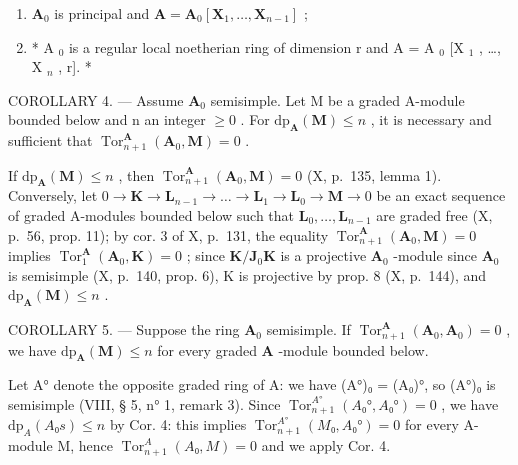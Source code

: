 \begin{enumerate}
\def\labelenumi{\alph{enumi})}
\item
  \(\mathbf{A}_0\) is principal and \(\mathbf{A} = \mathbf{A}_0[\mathbf{X}_1, \dots, \mathbf{X}_{n-1}]\) ;
\item
  * A \(_{0}\) is a regular local noetherian ring of dimension r and A = A \(_{0}\) {[}X \(_{1}\) , \ldots, X \(_{n}\) , r{]}. *
\end{enumerate}

COROLLARY 4. --- Assume \(\mathbf{A}_{0}\) semisimple. Let M be a graded A-module bounded below and n an integer \(\geqslant 0\) . For \(\mathrm{dp}_{\mathbf{A}}(\mathbf{M}) \leqslant n\) , it is necessary and sufficient that \(\operatorname{Tor}_{n+1}^{\mathbf{A}}(\mathbf{A}_{0}, \mathbf{M}) = 0\) .

If \(\mathrm{dp}_{\mathbf{A}}(\mathbf{M}) \leqslant n\) , then \(\operatorname{Tor}_{n+1}^{\mathbf{A}}(\mathbf{A}_0, \mathbf{M}) = 0\) (X, p.~135, lemma 1). Conversely, let \(0 \to \mathbf{K} \to \mathbf{L}_{n-1} \to \ldots \to \mathbf{L}_1 \to \mathbf{L}_0 \to \mathbf{M} \to 0\) be an exact sequence of graded A-modules bounded below such that \(\mathbf{L}_0, \ldots, \mathbf{L}_{n-1}\) are graded free (X, p.~56, prop. 11); by cor. 3 of X, p.~131, the equality \(\operatorname{Tor}_{n+1}^{\mathbf{A}}(\mathbf{A}_0, \mathbf{M}) = 0\) implies \(\operatorname{Tor}_1^{\mathbf{A}}(\mathbf{A}_0, \mathbf{K}) = 0\) ; since \(\mathbf{K} / \mathbf{J}_0\mathbf{K}\) is a projective \(\mathbf{A}_0\) -module since \(\mathbf{A}_0\) is semisimple (X, p.~140, prop. 6), K is projective by prop. 8 (X, p.~144), and \(\mathrm{dp}_{\mathbf{A}}(\mathbf{M}) \leqslant n\) .

COROLLARY 5. --- Suppose the ring \(\mathbf{A}_0\) semisimple. If \(\operatorname{Tor}_{n+1}^{\mathbf{A}}(\mathbf{A}_0, \mathbf{A}_0) = 0\) , we have \(\mathrm{dp}_{\mathbf{A}}(\mathbf{M}) \leqslant n\) for every graded \(\mathbf{A}\) -module bounded below.

Let A° denote the opposite graded ring of A: we have (A°)₀ = (A₀)°, so (A°)₀ is semisimple (VIII, § 5, n° 1, remark 3). Since \(\operatorname{Tor}_{n+1}^{A°}(A₀°, A₀°) = 0\) , we have \(\mathrm{dp}_A(A₀s) \leqslant n\) by Cor. 4: this implies \(\operatorname{Tor}_{n+1}^{A°}(M₀, A₀°) = 0\) for every A-module M, hence \(\operatorname{Tor}_{n+1}^{A}(A₀, M) = 0\) and we apply Cor. 4.

